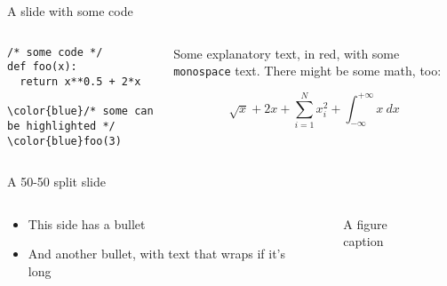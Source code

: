 \documentclass[12pt,aspectratio=169]{beamer}
\begin{document}
\begin{frame}[fragile]{A slide with some code}

	\begin{columns}
		\begin{column}{0.5\linewidth}
			\footnotesize
			\begin{Verbatim}[commandchars=\\\{\}]
/* some code */
def foo(x):
  return x**0.5 + 2*x

\color{blue}/* some can be highlighted */
\color{blue}foo(3)
      \end{Verbatim}
    \end{column}
    \begin{column}{0.5\linewidth}
      {\color{red} Some explanatory text, in red, with some \texttt{monospace} text.}
      There might be some math, too:

      $$\sqrt{x} + 2x + \sum_{i=1}^{N} x_i^2 + \int_{-\infty}^{+\infty}x~dx$$
    \end{column}
  \end{columns}

\end{frame}

\begin{frame}{A 50-50 split slide}

  \begin{columns}
    \begin{column}{0.5\linewidth}
      \begin{itemize}
        \item This side has a bullet
        \item And another bullet, with text that wraps if it's long
      \end{itemize}
    \end{column}
    \begin{column}{0.5\linewidth}
      \begin{figure}
        \centering
        \caption{A figure caption}
      \end{figure}
    \end{column}
  \end{columns}

\end{frame}
\end{document}
